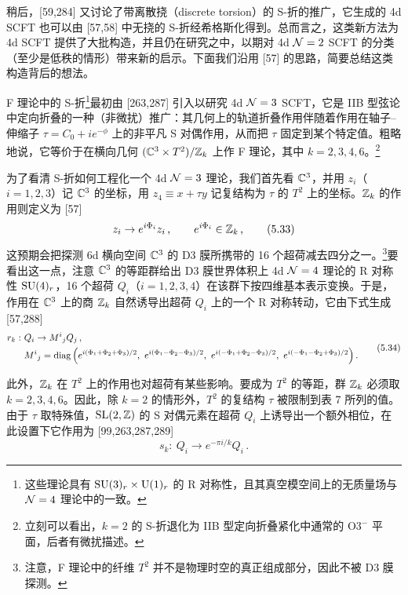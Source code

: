 稍后，[59,284] 又讨论了带离散挠（discrete torsion）的 S-折的推广，它生成的 4d SCFT 也可以由 [57,58] 中无挠的 S-折经希格斯化得到。总而言之，这类新方法为 4d SCFT 提供了大批构造，并且仍在研究之中，以期对 4d $\mathcal{N}=2$ SCFT 的分类（至少是低秩的情形）带来新的启示。下面我们沿用 [57] 的思路，简要总结这类构造背后的想法。

F 理论中的 S-折\footnote{这些理论具有 $\mathrm{SU}(3)_r\times \mathrm{U}(1)_r$ 的 R 对称性，且其真空模空间上的无质量场与 $\mathcal{N}=4$ 理论中的一致。}最初由 [263,287] 引入以研究 4d $\mathcal{N}=3$ SCFT，它是 IIB 型弦论中定向折叠的一种（非微扰）推广：其几何上的轨道折叠作用伴随着作用在轴子--伸缩子 $\tau=C_0+i e^{-\phi}$ 上的非平凡 S 对偶作用，从而把 $\tau$ 固定到某个特定值。粗略地说，它等价于在横向几何 $(\mathbb{C}^3\times T^2)/\mathbb{Z}_k$ 上作 F 理论，其中 $k=2,3,4,6$。\footnote{立刻可以看出，$k=2$ 的 S-折退化为 IIB 型定向折叠紧化中通常的 $\mathrm{O3}^-$ 平面，后者有微扰描述。}

为了看清 S-折如何工程化一个 4d $\mathcal{N}=3$ 理论，我们首先看 $\mathbb{C}^3$，并用 $z_i$（$i=1,2,3$）记 $\mathbb{C}^3$ 的坐标，用 $z_4\equiv x+\tau y$ 记复结构为 $\tau$ 的 $T^2$ 上的坐标。$\mathbb{Z}_k$ 的作用则定义为 [57]
\begin{equation}
z_i \to e^{i\Phi_i} z_i\,,\qquad e^{i\Phi_i}\in\mathbb{Z}_k\,,
\tag{5.33}
\end{equation}
这预期会把探测 6d 横向空间 $\mathbb{C}^3$ 的 D3 膜所携带的 16 个超荷减去四分之一。\footnote{注意，F 理论中的纤维 $T^2$ 并不是物理时空的真正组成部分，因此不被 D3 膜探测。}要看出这一点，注意 $\mathbb{C}^3$ 的等距群给出 D3 膜世界体积上 4d $\mathcal{N}=4$ 理论的 R 对称性 $\mathrm{SU}(4)_r$，16 个超荷 $Q_i$（$i=1,2,3,4$）在该群下按四维基本表示变换。于是，作用在 $\mathbb{C}^3$ 上的商 $\mathbb{Z}_k$ 自然诱导出超荷 $Q_i$ 上的一个 R 对称转动，它由下式生成 [57,288]
\begin{equation}
  \begin{aligned}
    r_k:\ & Q_i \to M^i{}_j Q_j\,,\\
    & M^i{}_j = \diag\Big(e^{i(\Phi_1+\Phi_2+\Phi_3)/2},\ e^{i(\Phi_1-\Phi_2-\Phi_3)/2},\ e^{i(-\Phi_1+\Phi_2-\Phi_3)/2},\ e^{i(-\Phi_1-\Phi_2+\Phi_3)/2}\Big)\,.
  \end{aligned}
  \tag{5.34}
\end{equation}

此外，$\mathbb{Z}_k$ 在 $T^2$ 上的作用也对超荷有某些影响。要成为 $T^2$ 的等距，群 $\mathbb{Z}_k$ 必须取 $k=2,3,4,6$。因此，除 $k=2$ 的情形外，$T^2$ 的复结构 $\tau$ 被限制到表 7 所列的值。由于 $\tau$ 取特殊值，$\mathrm{SL}(2,\mathbb{Z})$ 的 S 对偶元素在超荷 $Q_i$ 上诱导出一个额外相位，在此设置下它作用为 [99,263,287,289]
\begin{equation}
s_k:\ Q_i \to e^{-\pi i/k} Q_i\,.
\tag{5.35}
\end{equation}

